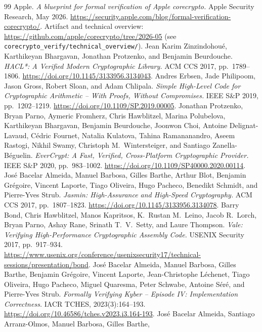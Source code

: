 \documentclass[journal=tches,submission,review]{iacrtrans}
\begin{document}
\begin{thebibliography}{99}
 Apple. \emph{A blueprint for formal verification of Apple corecrypto.}
  Apple Security Research, May 2026. \url{https://security.apple.com/blog/formal-verification-corecrypto/}.
  Artifact and technical overview: \url{https://github.com/apple/corecrypto/tree/2026-05}
  (see \texttt{corecrypto\_verify/technical\_overview/}).
 Jean Karim Zinzindohou\'e, Karthikeyan Bhargavan, Jonathan Protzenko, and Benjamin
  Beurdouche. \emph{HACL*: A Verified Modern Cryptographic Library.} ACM CCS 2017, pp.\ 1789--1806.
  \url{https://doi.org/10.1145/3133956.3134043}.
 Andres Erbsen, Jade Philipoom, Jason Gross, Robert Sloan, and Adam Chlipala.
  \emph{Simple High-Level Code for Cryptographic Arithmetic -- With Proofs, Without Compromises.}
  IEEE S\&P 2019, pp.\ 1202--1219. \url{https://doi.org/10.1109/SP.2019.00005}.
 Jonathan Protzenko, Bryan Parno, Aymeric Fromherz, Chris Hawblitzel, Marina
  Polubelova, Karthikeyan Bhargavan, Benjamin Beurdouche, Joonwon Choi, Antoine Delignat-Lavaud,
  C\'edric Fournet, Natalia Kulatova, Tahina Ramananandro, Aseem Rastogi, Nikhil Swamy, Christoph
  M.\ Wintersteiger, and Santiago Zanella-B\'eguelin. \emph{EverCrypt: A Fast, Verified,
  Cross-Platform Cryptographic Provider.} IEEE S\&P 2020, pp.\ 983--1002.
  \url{https://doi.org/10.1109/SP40000.2020.00114}.
 Jos\'e Bacelar Almeida, Manuel Barbosa, Gilles Barthe, Arthur Blot, Benjamin
  Gr\'egoire, Vincent Laporte, Tiago Oliveira, Hugo Pacheco, Benedikt Schmidt, and Pierre-Yves Strub.
  \emph{Jasmin: High-Assurance and High-Speed Cryptography.} ACM CCS 2017, pp.\ 1807--1823.
  \url{https://doi.org/10.1145/3133956.3134078}.
 Barry Bond, Chris Hawblitzel, Manos Kapritsos, K.\ Rustan M.\ Leino, Jacob R.\ Lorch,
  Bryan Parno, Ashay Rane, Srinath T.\ V.\ Setty, and Laure Thompson. \emph{Vale: Verifying
  High-Performance Cryptographic Assembly Code.} USENIX Security 2017, pp.\ 917--934.
  \url{https://www.usenix.org/conference/usenixsecurity17/technical-sessions/presentation/bond}.
 Jos\'e Bacelar Almeida, Manuel Barbosa, Gilles Barthe, Benjamin Gr\'egoire,
  Vincent Laporte, Jean-Christophe L\'echenet, Tiago Oliveira, Hugo Pacheco, Miguel Quaresma, Peter
  Schwabe, Antoine S\'er\'e, and Pierre-Yves Strub. \emph{Formally Verifying Kyber -- Episode IV:
  Implementation Correctness.} IACR TCHES, 2023(3):164--193.
  \url{https://doi.org/10.46586/tches.v2023.i3.164-193}.
 Jos\'e Bacelar Almeida, Santiago Arranz-Olmos, Manuel Barbosa, Gilles Barthe,

\end{thebibliography}
\end{document}
